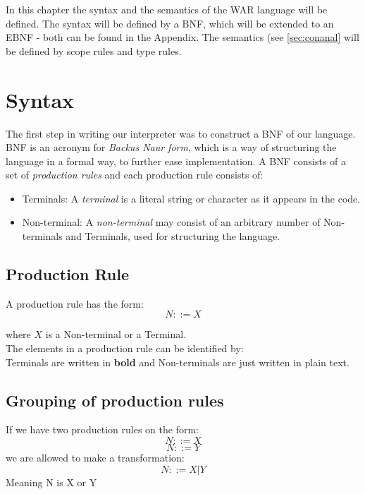 In this chapter the syntax and the semantics of the WAR language will be defined. The syntax will be defined by a BNF, which will be extended to an EBNF - both can be found in the Appendix. The semantics (see \ref{sec:conanal} will be defined by scope rules and type rules.
\section{Syntax}
	The first step in writing our interpreter was to construct a BNF of our language. 
	BNF is an acronym for {\it Backus Naur form}, which is a way of
	structuring the language in a formal way, to further ease implementation. 
	A BNF consists of a set of {\it production rules} and each
	production rule consists of: \\
	\begin{itemize}
		 \item Terminals: A {\it terminal } is a literal string or character as it appears in the code.
		 \item Non-terminal: A {\it non-terminal } may consist of an arbitrary number of Non-terminals and Terminals, used for structuring the language.
	\end{itemize}
	
	\subsection*{Production Rule}
		A production rule has the form: \\
		\begin{equation}
			N ::= X
		\end{equation}
		
		where $X$ is a Non-terminal or a Terminal. \\
		
		The elements in a production rule can be identified by: \\
		Terminals are written in {\bf bold } and 
		Non-terminals are just written in plain text.
	\subsection*{Grouping of production rules}
		If we have two production rules on the form:\\
		\begin{equation}
			N ::= X 
		\end{equation}
		\begin{equation}
			N ::= Y 
		\end{equation}
		we are allowed to make a transformation: \\
		\begin{equation}
			N ::= X | Y 
		\end{equation}
		Meaning N is X or Y \\
		
